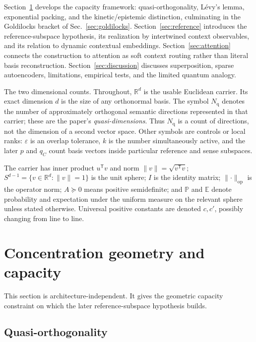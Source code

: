 \documentclass[
  aps,
  reprint,
  superscriptaddress,
  floatfix,
  nofootinbib,
  longbibliography
]{revtex4-2}
\newcommand{\R}{\mathbb{R}}
\newcommand{\E}{\mathbb{E}}
\newcommand{\Prob}{\mathbb{P}}
\newcommand{\Sph}[1]{S^{#1}}
\newcommand{\Nq}{N_{\mathrm q}}
\newcommand{\T}{^{\mathsf{T}}}
\newcommand{\opnorm}[1]{\lVert #1 \rVert_{\mathrm{op}}}
\newcommand{\norm}[1]{\lVert #1 \rVert}
\begin{document}
Section~\ref{sec:concentration} develops the capacity framework:
quasi-orthogonality, L\'evy's lemma, exponential packing, and the
kinetic/epistemic distinction, culminating in the Goldilocks bracket of
Sec.~\ref{sec:goldilocks}. Section~\ref{sec:reference} introduces the
reference-subspace hypothesis, its realization by intertwined context
observables, and its relation to dynamic contextual embeddings.
Section~\ref{sec:attention} connects the construction to attention as soft
context routing rather than literal basis reconstruction.
Section~\ref{sec:discussion} discusses superposition, sparse
autoencoders, limitations, empirical tests, and the limited quantum
analogy.

{The two dimensional counts.}
Throughout, $\R^{d}$ is the usable Euclidean carrier.  Its exact dimension
$d$ is the size of any orthonormal basis.  The symbol $\Nq$ denotes the number
of approximately orthogonal semantic directions represented in that carrier;
these are the paper's \emph{quasi-dimensions}.  Thus $\Nq$ is a count of
directions, not the dimension of a second vector space.  Other symbols are
controls or local ranks: $\varepsilon$ is an overlap tolerance, $k$ is the
number simultaneously active, and the later $p$ and $q_C$ count basis vectors
inside particular reference and sense subspaces.

The carrier has inner product $u\T v$
and norm $\norm{v}=\sqrt{v\T v}$; $\Sph{d-1}=\{v\in\R^{d}:\norm{v}=1\}$
is the unit sphere; $I$ is the identity matrix; $\opnorm{\cdot}$ is the
operator norm; $A\succeq0$ means positive semidefinite; and $\Prob$ and
$\E$ denote probability and expectation under the uniform measure on
the relevant sphere unless stated otherwise. Universal positive
constants are denoted $c,c'$, possibly changing from line to line.

\section{Concentration geometry and capacity}
\label{sec:concentration}

This section is architecture-independent. It gives the geometric
capacity constraint on which the later reference-subspace hypothesis builds.

\subsection{Quasi-orthogonality}
\label{sec:quasiortho}
\end{document}

